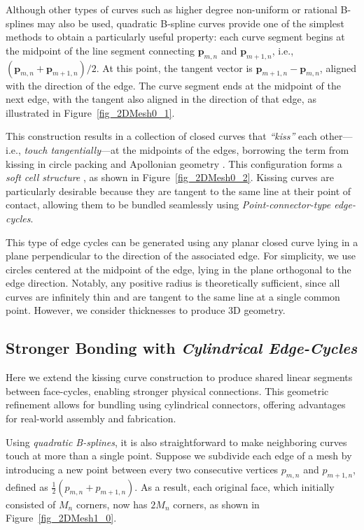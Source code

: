 \documentclass[times,twocolumn,final]{elsarticle}
\begin{document}
Although other types of curves such as higher degree non-uniform or rational B-splines may also be used, quadratic B-spline curves provide one of the simplest methods to obtain a particularly useful property: each curve segment begins at the midpoint of the line segment connecting $\mathbf{p}_{m,n}$ and $\mathbf{p}_{m+1,n}$, i.e., $(\mathbf{p}_{m,n} + \mathbf{p}_{m+1,n})/2$. At this point, the tangent vector is $\mathbf{p}_{m+1,n} - \mathbf{p}_{m,n}$, aligned with the direction of the edge. The curve segment ends at the midpoint of the next edge, with the tangent also aligned in the direction of that edge, as illustrated in Figure~\ref{fig_2DMesh0_1}.

This construction results in a collection of closed curves that \textit{“kiss”} each other—i.e., \textit{touch tangentially}—at the midpoints of the edges, borrowing the term from kissing in circle packing and Apollonian geometry \cite{morita2011some}. This configuration forms a \textit{soft cell structure} \cite{domokos2024soft}, as shown in Figure~\ref{fig_2DMesh0_2}. Kissing curves are particularly desirable because they are tangent to the same line at their point of contact, allowing them to be bundled seamlessly using \textit{Point-connector-type edge-cycles}. 

This type of edge cycles can be generated using any planar closed curve lying in a plane perpendicular to the direction of the associated edge. For simplicity, we use circles centered at the midpoint of the edge, lying in the plane orthogonal to the edge direction. Notably, any positive radius is theoretically sufficient, since all curves are infinitely thin and are tangent to the same line at a single common point. However, we consider thicknesses to produce 3D geometry. 

\subsection{Stronger Bonding with \textit{Cylindrical Edge-Cycles}}

Here we extend the kissing curve construction to produce shared linear segments between face-cycles, enabling stronger physical connections. This geometric refinement allows for bundling using cylindrical connectors, offering advantages for real-world assembly and fabrication.

Using \textit{quadratic B-splines}, it is also straightforward to make neighboring curves touch at more than a single point. Suppose we subdivide each edge of a mesh by introducing a new point between every two consecutive vertices $\textit{p}_{m,n}$ and $\textit{p}_{m+1,n}$, defined as $\frac{1}{2}(\textit{p}_{m,n}+\textit{p}_{m+1,n})$. As a result, each original face, which initially consisted of $M_n$ corners, now has $2M_n$ corners, as shown in Figure~\ref{fig_2DMesh1_0}.
\end{document}
